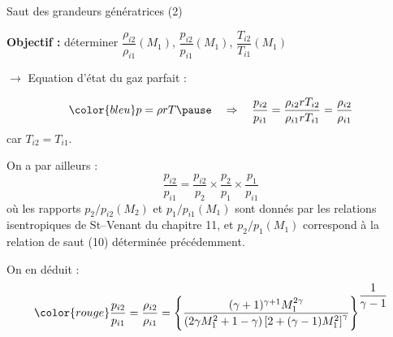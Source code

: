 \begin{frame}{Saut des grandeurs génératrices (2)}

\small

\textbf{Objectif :} 
déterminer $\dfrac{\rho_{i2}}{\rho_{i1}}(M_1)$, 
$\dfrac{p_{i2}}{p_{i1}}(M_1)$, $\dfrac{T_{i2}}{T_{i1}}(M_1)$

\bigskip

$\rightarrow$ Equation d'état du gaz parfait : 

\[ \color{bleu}
	p = \rho r T 
	\pause
	\quad \Rightarrow \quad 
	\frac{p_{i2}}{p_{i1}} = \frac{\rho_{i2} r T_{i2}}{\rho_{i1} r T_{i1}} = \frac{\rho_{i2}}{\rho_{i1}}
\]
car $T_{i2} = T_{i1}$.

\pause
\medskip

On a par ailleurs :
\[
	\frac{p_{i2}}{p_{i1}} 
	= 
	\frac{p_{i2}}{p_{2}} \times \frac{p_{2}}{p_{1}} \times \frac{p_{1}}{p_{i1}}
\]	
où les rapports $p_2/p_{i2}(M_2)$ et $p_1/p_{i1}(M_1)$ sont donnés par les relations isentropiques de St--Venant du chapitre 11, et $p_2/p_1(M_1)$ correspond à la relation de saut (10) déterminée précédemment.

\pause
\medskip

On en déduit :
\begin{equation}
	\color{rouge}
	\frac{p_{i2}}{p_{i1}} = \frac{\rho_{i2}}{\rho_{i1}} = \left \{
	\frac{(\gamma+1)^{\gamma+1} M_1^{2\gamma}}{(2\gamma M_1^2+1-\gamma)\left [ 2+(\gamma-1)M_1^2\right ]^\gamma}
	\right \}^{\dfrac{1}{\gamma - 1}}
\end{equation}

\vspace{7mm}

\end{frame}

